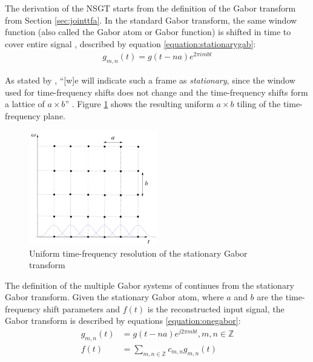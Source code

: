 \documentclass[report.tex]{subfiles}
\begin{document}
The derivation of the NSGT starts from the definition of the Gabor transform from Section \ref{sec:jointtfa}. In the standard Gabor transform, the same window function (also called the Gabor atom or Gabor function) is shifted in time to cover entire signal \parencite{adaptivecqt}, described by equation \eqref{equation:stationarygab}:
\begin{align} \tag{11}\label{equation:stationarygab}
g_{m, n}(t) = g(t - na)e^{2\pi i m b t}
\end{align}

As stated by \citeauthor{adaptivecqt}, ``[w]e will indicate such a frame as \textit{stationary}, since the window used for time-frequency shifts does not change and the time-frequency shifts form a lattice of $a \times b$'' \parencite[3]{adaptivecqt}. Figure \ref{fig:uniformtflattice} shows the resulting uniform $a \times b$ tiling of the time-frequency plane.

\begin{figure}[ht]
	\centering
	\includegraphics[width=0.5\textwidth]{./images-tftheory/stationarygabor.png}
	\caption{Uniform time-frequency resolution of the stationary Gabor transform \parencite[3]{adaptivecqt}}
	\label{fig:uniformtflattice}
\end{figure}

The definition of the multiple Gabor systems of \textcite{doerflerphd} continues from the stationary Gabor transform. Given the stationary Gabor atom, where $a$ and $b$ are the time-frequency shift parameters and $f(t)$ is the reconstructed input signal, the Gabor transform is described by equations \eqref{equation:onegabor}:
\begin{align}
	\nonumber g_{m,n}(t) &= g(t - na)e^{j2\pi m b t}, m,n \in \mathbb{Z}\\
	\nonumber f(t) &= \sum_{m,n \in \mathbb{Z}}c_{m,n}g_{m,n}(t) \tag{12}\label{equation:onegabor}
\end{align}
\end{document}
